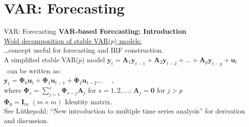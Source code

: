 \documentclass[usenames,dvipsnames]{beamer}
\begin{document}
\section{VAR: Forecasting}
\begin{frame}{VAR: Forecasting}
\textbf{VAR-based Forecasting: Introduction}\\
\vspace*{4mm}
\underline{Wold decomposition of stable VAR($p$) models:}\\
\vspace*{1mm}
\dots concept useful for forecasting and IRF construction. \\
\vspace*{3mm}
A simplified stable VAR($p$) model $\bm{y}_t = \bm{A}_1 \bm{y}_{t-1} + \bm{A}_2 \bm{y}_{t-2} + \dots + \bm{A}_p \bm{y}_{t-p} + \bm{u}_t$ ~can be written as: \\
\vspace{0.3cm}
$\bm{y}_t = \bm{\Phi}_0 \bm{u}_t + \bm{\Phi}_1 \bm{u}_{t-1} + \bm{\Phi}_2 \bm{u}_{t-2} \dots $ ~~,\\
\vspace*{3mm}
where $\bm{\Phi}_s = \sum_{j=1}^{s} \bm{\Phi}_{s-j} \bm{A}_j $ for $s = 1,2,\dots$; $\bm{A}_j = \bm{0}$ for $j > p$\\
\vspace*{2mm}
\qquad \quad $\bm{\Phi}_0 = \bm{I}_m$ $(m \times m)$ Identity matrix.\\
\vspace*{3mm}
See Lütkepohl: ``New introduction to multiple time series analysis'' for derivation and discussion.
\end{frame}
\end{document}
